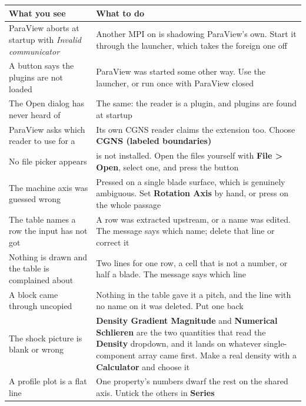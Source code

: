 \documentclass[11pt,a4paper]{article}
\newcommand{\prop}[1]{\textbf{#1}}          %
\newcommand{\menu}[1]{\textbf{#1}}          %
\begin{document}
\begin{center}
\begin{longtable}{@{}L{52mm}L{74mm}@{}}
\toprule
\textbf{What you see} & \textbf{What to do} \\
\midrule
\endhead
ParaView aborts at startup with \emph{Invalid communicator} &
  Another MPI on  is shadowing ParaView's own. Start it through the
  launcher, which takes the foreign one off \\
\addlinespace
A button says the plugins are not loaded &
  ParaView was started some other way. Use the launcher, or run
   once with ParaView closed \\
\addlinespace
The Open dialog has never heard of  &
  The same: the reader is a plugin, and plugins are found at startup \\
\addlinespace
ParaView asks which reader to use for a  &
  Its own CGNS reader claims the extension too. Choose \menu{CGNS (labeled
  boundaries)} \\
\addlinespace
No file picker appears &
   is not installed. Open the files yourself with \menu{File >
  Open}, select one, and press the button \\
\addlinespace
The machine axis was guessed wrong &
  Pressed on a single blade surface, which is genuinely ambiguous. Set
  \prop{Rotation Axis} by hand, or press on the whole passage \\
\addlinespace
The table names a row the input has not got &
  A row was extracted upstream, or a name was edited. The message says which
  name; delete that line or correct it \\
\addlinespace
Nothing is drawn and the table is complained about &
  Two lines for one row, a cell that is not a number, or half a blade. The
  message says which line \\
\addlinespace
A block came through uncopied &
  Nothing in the table gave it a pitch, and the line with no name on it was
  deleted. Put one back \\
\addlinespace
The shock picture is blank or wrong &
  \prop{Density Gradient Magnitude} and \prop{Numerical Schlieren} are the two
  quantities that read the \prop{Density} dropdown, and it lands on whatever
  single-component array came first. Make a real density with a
  \menu{Calculator} and choose it \\
\addlinespace
A profile plot is a flat line &
  One property's numbers dwarf the rest on the shared axis. Untick the others in
  \prop{Series} \\
\bottomrule
\end{longtable}
\end{center}
\end{document}
